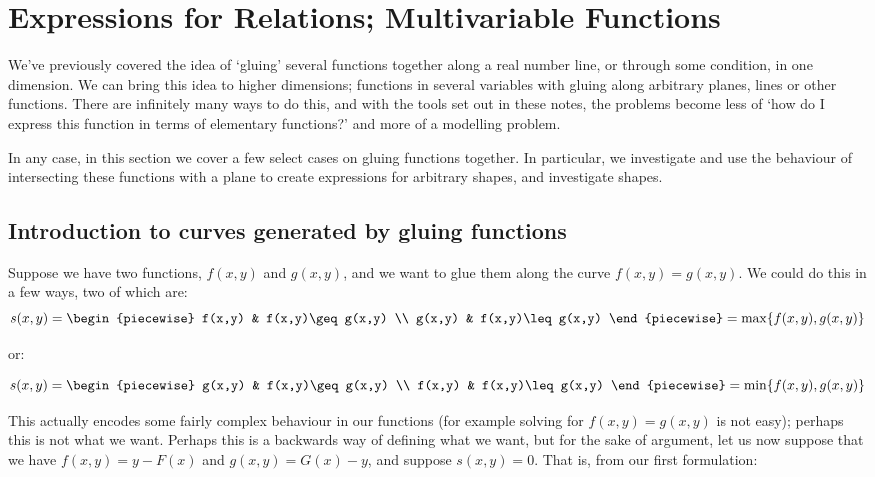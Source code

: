 \section{Expressions for Relations; Multivariable Functions}
We've previously covered the idea of `gluing' several functions together along a real number line, or through some condition, in one dimension. We can bring this idea to higher dimensions; functions in several variables with gluing along arbitrary planes, lines or other functions. There are infinitely many ways to do this, and with the tools set out in these notes, the problems become less of `how do I express this function in terms of elementary functions?' and more of a modelling problem.

In any case, in this section we cover a few select cases on gluing functions together. In particular, we investigate and use the behaviour of intersecting these functions with a plane to create expressions for arbitrary shapes, and investigate shapes.

\subsection{Introduction to curves generated by gluing functions}
Suppose we have two functions, $f(x,y)$ and $g(x,y)$, and we want to glue them along the curve $f(x,y)=g(x,y)$. We could do this in a few ways, two of which are:
$$
    s(x,y)=\begin{piecewise}
        f(x,y) & f(x,y)\geq g(x,y) \\
        g(x,y) & f(x,y)\leq g(x,y)
    \end{piecewise}=\max\br{f(x,y),g(x,y)}
$$

or:

$$
    s(x,y)=\begin{piecewise}
        g(x,y) & f(x,y)\geq g(x,y) \\
        f(x,y) & f(x,y)\leq g(x,y)
    \end{piecewise}=\min\br{f(x,y),g(x,y)}
$$

This actually encodes some fairly complex behaviour in our functions (for example solving for $f(x,y)=g(x,y)$ is not easy); perhaps this is not what we want. Perhaps this is a backwards way of defining what we want, but for the sake of argument, let us now suppose that we have $f(x,y)=y-F(x)$ and $g(x,y)=G(x)-y$, and suppose $s(x,y)=0$. That is, from our first formulation:

